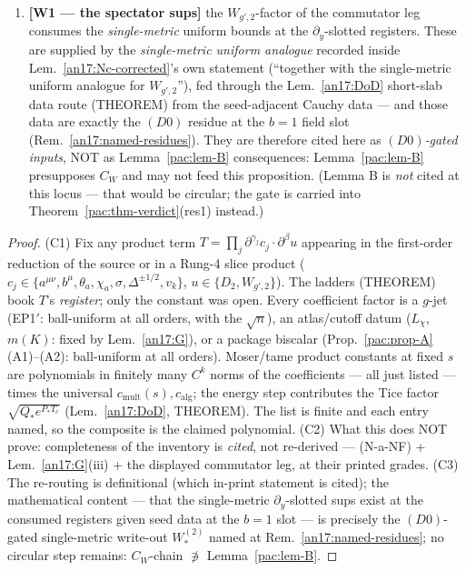 \begin{proposition}
\begin{enumerate}[label=\textup{(C\arabic*)},leftmargin=*,nosep]
  (N-a-NF) (Prop.~\ref{pac:prop-A}(A4)), the gluing defect legs
  (Lem.~\ref{an17:G}(iii), THEOREM), and the commutator leg
  $(\square_g-\square_{g'})W_{g',2}$, whose coefficients are
  $(g{-}g')$-linear with Banach-algebra placements at $s>11$;
\item \textbf{[W1 --- the spectator sups]} the
  $W_{g',2}$-factor of the commutator leg consumes the
  \emph{single-metric} uniform bounds at the $\partial_y$-slotted
  registers. These are supplied by the \emph{single-metric uniform
  analogue} recorded inside Lem.~\ref{an17:Nc-corrected}'s own statement
  (``together with the single-metric uniform analogue
  for $W_{g',2}$''), fed through the Lem.~\ref{an17:DoD} short-slab data route
  (THEOREM) from the seed-adjacent Cauchy data --- and
  those data are exactly the $(D0)$ residue at the $b{=}1$ field slot
  (Rem.~\ref{an17:named-residues}). They are therefore cited here
  as \emph{$(D0)$-gated inputs}, NOT as Lemma~\ref{pac:lem-B}
  consequences: Lemma~\ref{pac:lem-B} presupposes $C_W$ and may not
  feed this proposition. (Lemma B is \emph{not} cited at this
  locus --- that would be circular; the gate is carried into
  Theorem~\ref{pac:thm-verdict}(res1) instead.)
\end{enumerate}
\end{proposition}
\begin{proof}
(C1) Fix any product term
$T=\prod_j\partial^{\gamma_j}c_j\cdot\partial^\beta u$ appearing in
the first-order reduction of the source or in a Rung-4 slice product
($c_j\in\{a^{\mu\nu},b^\mu,\theta_a,\chi_a,\sigma,\Delta^{\pm1/2},
v_k\}$, $u\in\{D_2,W_{g',2}\}$). The ladders (THEOREM) book $T$'s
\emph{register}; only the constant was open. Every coefficient factor
is a $g$-jet (EP1$'$: ball-uniform at all orders, with the $\sqrt n$),
an atlas/cutoff datum ($L_\chi$, $m(K)$: fixed by Lem.~\ref{an17:G}), or a
package biscalar (Prop.~\ref{pac:prop-A}(A1)--(A2): ball-uniform at
all orders). Moser/tame product constants at fixed $s$ are polynomials
in finitely many $C^k$ norms of the coefficients --- all just listed
--- times the universal $c_{\mathrm{mult}}(s),c_{\mathrm{alg}}$; the
energy step contributes the Tice factor $\sqrt{Q_*e^{P_*T_c}}$
(Lem.~\ref{an17:DoD}, THEOREM). The list is finite and each entry named, so the
composite is the claimed polynomial. (C2) What this does NOT prove:
completeness of the inventory is \emph{cited}, not re-derived ---
(N-a-NF) + Lem.~\ref{an17:G}(iii) + the displayed commutator leg, at their
printed grades. (C3) The re-routing is definitional (which in-print
statement is cited); the mathematical content --- that the
single-metric $\partial_y$-slotted sups exist at the consumed
registers given seed data at the $b{=}1$ slot --- is precisely the
$(D0)$-gated single-metric write-out $W^{(2)}_*$ named at
Rem.~\ref{an17:named-residues}; no circular step remains: $C_W$-chain
$\not\ni$ Lemma~\ref{pac:lem-B}. \qedhere
\end{proof}


